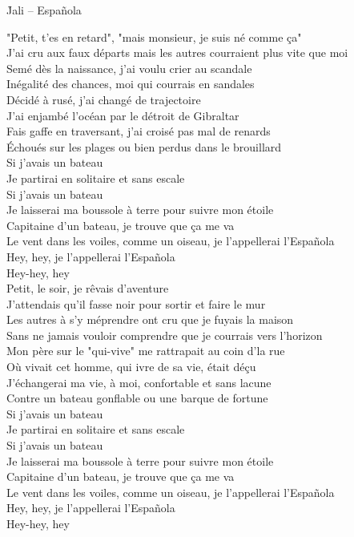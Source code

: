 \documentclass{novel}
\begin{document}
\newpage
\small
\h*{Jali – Española}
\begin{multicols}{2}
"Petit, t'es en retard", "mais monsieur, je suis né comme ça" \\
J'ai cru aux faux départs mais les autres courraient plus vite que moi \\
Semé dès la naissance, j'ai voulu crier au scandale \\
Inégalité des chances, moi qui courrais en sandales \\
Décidé à rusé, j'ai changé de trajectoire \\
J'ai enjambé l'océan par le détroit de Gibraltar \\
Fais gaffe en traversant, j'ai croisé pas mal de renards \\
Échoués sur les plages ou bien perdus dans le brouillard \\

Si j'avais un bateau \\
Je partirai en solitaire et sans escale \\
Si j'avais un bateau \\
Je laisserai ma boussole à terre pour suivre mon étoile \\
Capitaine d'un bateau, je trouve que ça me va \\
Le vent dans les voiles, comme un oiseau, je l'appellerai l'Española \\
Hey, hey, je l'appellerai l'Española \\
Hey-hey, hey \\

Petit, le soir, je rêvais d'aventure \\
J'attendais qu'il fasse noir pour sortir et faire le mur \\
Les autres à s'y méprendre ont cru que je fuyais la maison \\
Sans ne jamais vouloir comprendre que je courrais vers l'horizon \\
Mon père sur le "qui-vive" me rattrapait au coin d'la rue \\
Où vivait cet homme, qui ivre de sa vie, était déçu \\
J'échangerai ma vie, à moi, confortable et sans lacune \\
Contre un bateau gonflable ou une barque de fortune \\

Si j'avais un bateau \\
Je partirai en solitaire et sans escale \\
Si j'avais un bateau \\
Je laisserai ma boussole à terre pour suivre mon étoile \\
Capitaine d'un bateau, je trouve que ça me va \\
Le vent dans les voiles, comme un oiseau, je l'appellerai l'Española \\
Hey, hey, je l'appellerai l'Española \\
Hey-hey, hey \\


\end{multicols}
\end{document}
